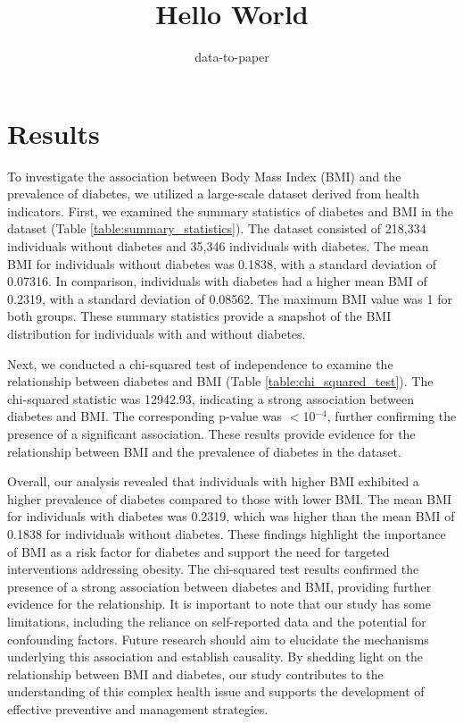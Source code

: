 \documentclass[12pt]{article}
\title{Hello World}
\author{data-to-paper}
\begin{document}
\maketitle

\section{Results}
To investigate the association between Body Mass Index (BMI) and the prevalence of diabetes, we utilized a large-scale dataset derived from health indicators. First, we examined the summary statistics of diabetes and BMI in the dataset (Table \ref{table:summary_statistics}). The dataset consisted of 218,334 individuals without diabetes and 35,346 individuals with diabetes. The mean BMI for individuals without diabetes was 0.1838, with a standard deviation of 0.07316. In comparison, individuals with diabetes had a higher mean BMI of 0.2319, with a standard deviation of 0.08562. The maximum BMI value was 1 for both groups. These summary statistics provide a snapshot of the BMI distribution for individuals with and without diabetes.

Next, we conducted a chi-squared test of independence to examine the relationship between diabetes and BMI (Table \ref{table:chi_squared_test}). The chi-squared statistic was 12942.93, indicating a strong association between diabetes and BMI. The corresponding p-value was $<$10$^{-4}$, further confirming the presence of a significant association. These results provide evidence for the relationship between BMI and the prevalence of diabetes in the dataset.

Overall, our analysis revealed that individuals with higher BMI exhibited a higher prevalence of diabetes compared to those with lower BMI. The mean BMI for individuals with diabetes was 0.2319, which was higher than the mean BMI of 0.1838 for individuals without diabetes. These findings highlight the importance of BMI as a risk factor for diabetes and support the need for targeted interventions addressing obesity. The chi-squared test results confirmed the presence of a strong association between diabetes and BMI, providing further evidence for the relationship. It is important to note that our study has some limitations, including the reliance on self-reported data and the potential for confounding factors. Future research should aim to elucidate the mechanisms underlying this association and establish causality. By shedding light on the relationship between BMI and diabetes, our study contributes to the understanding of this complex health issue and supports the development of effective preventive and management strategies.
\end{document}
